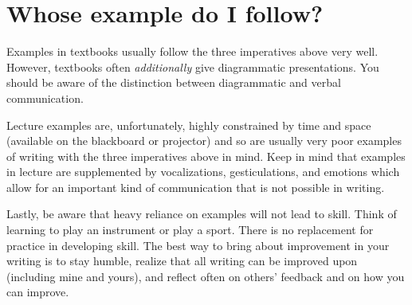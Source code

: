 \documentclass[12pt]{article}
\begin{document}
\section*{Whose example do I follow?}
Examples in textbooks usually follow the three imperatives above very well. However, textbooks often {\it additionally} give diagrammatic presentations. You should be aware of the distinction between diagrammatic  and verbal communication.

Lecture examples are, unfortunately, highly constrained by time and space (available on the blackboard or projector) and so are usually very poor examples of writing with the three imperatives above in mind. Keep in mind that examples in lecture are supplemented by vocalizations, gesticulations, and emotions which allow for an important kind of communication that is not possible in writing. 

Lastly, be aware that heavy reliance on examples will not lead to skill. 
Think of learning to play an instrument or play a sport. 
There is no replacement for practice in developing skill.
The best way to bring about improvement in your writing is to stay humble, realize that all writing can be improved upon (including mine and yours), and reflect often on others' feedback and on how you can improve. \\

\end{document}
